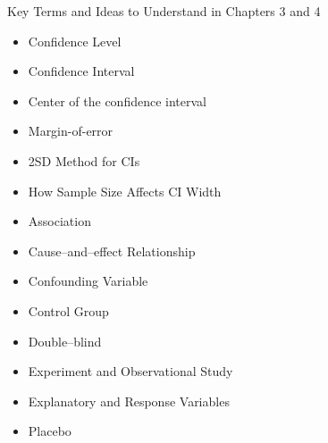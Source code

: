 \documentclass[13pt]{beamer}
\begin{document}
\begin{frame}{Key Terms and Ideas to Understand in Chapters 3 and 4}
\begin{multicols}{2}
\begin{itemize}
    \item Confidence Level
    \item Confidence Interval
    \item Center of the confidence interval
    \item Margin-of-error
    \item 2SD Method for CIs
    \item How Sample Size Affects CI Width
	\item Association
    \item Cause--and--effect Relationship
    \item Confounding Variable
    \item Control Group
    \item Double--blind
    \item Experiment and Observational Study
    \item Explanatory and Response Variables
    \item Placebo
\end{itemize}
\end{multicols}
\end{frame}
\end{document}

